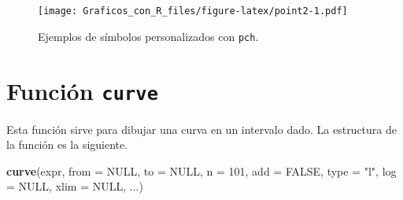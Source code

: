 \documentclass[10pt,]{krantz}
\makeatletter
\newenvironment{Shaded}{\begin{snugshade}}{\end{snugshade}}
\newcommand{\KeywordTok}[1]{\textcolor[rgb]{0.13,0.29,0.53}{\textbf{#1}}}
\newcommand{\DataTypeTok}[1]{\textcolor[rgb]{0.13,0.29,0.53}{#1}}
\newcommand{\DecValTok}[1]{\textcolor[rgb]{0.00,0.00,0.81}{#1}}
\newcommand{\FloatTok}[1]{\textcolor[rgb]{0.00,0.00,0.81}{#1}}
\newcommand{\StringTok}[1]{\textcolor[rgb]{0.31,0.60,0.02}{#1}}
\newcommand{\OtherTok}[1]{\textcolor[rgb]{0.56,0.35,0.01}{#1}}
\newcommand{\OperatorTok}[1]{\textcolor[rgb]{0.81,0.36,0.00}{\textbf{#1}}}
\newcommand{\NormalTok}[1]{#1}
\newenvironment{kframe}{%
\medskip{}
\setlength{\fboxsep}{.8em}
 \def\at@end@of@kframe{}%
 \ifinner\ifhmode%
  \def\at@end@of@kframe{\end{minipage}}%
  \begin{minipage}{\columnwidth}%
 \fi\fi%
 \def\FrameCommand##1{\hskip\@totalleftmargin \hskip-\fboxsep
 \colorbox{shadecolor}{##1}\hskip-\fboxsep
     \hskip-\linewidth \hskip-\@totalleftmargin \hskip\columnwidth}%
 \MakeFramed {\advance\hsize-\width
   \@totalleftmargin\z@ \linewidth\hsize
   \@setminipage}}%
 {\par\unskip\endMakeFramed%
 \at@end@of@kframe}
\renewenvironment{Shaded}{\begin{kframe}}{\end{kframe}}
\makeatother
\begin{document}
\begin{Shaded}
\end{Shaded}

\begin{figure}
\centering
\texttt{[image: Graficos\_con\_R\_files/figure-latex/point2-1.pdf]}
\caption{\label{fig:point2}Ejemplos de símbolos personalizados con
\texttt{pch}.}
\end{figure}

\section{\texorpdfstring{Función \texttt{curve} 
}{Función curve  }}\label{funcion-curve}

Esta función sirve para dibujar una curva en un intervalo dado. La
estructura de la función es la siguiente.

\begin{Shaded}
\begin{Highlighting}[]
\KeywordTok{curve}\NormalTok{(expr, }\DataTypeTok{from =} \OtherTok{NULL}\NormalTok{, }\DataTypeTok{to =} \OtherTok{NULL}\NormalTok{, }\DataTypeTok{n =} \DecValTok{101}\NormalTok{, }\DataTypeTok{add =} \OtherTok{FALSE}\NormalTok{,}
      \DataTypeTok{type =} \StringTok{"l"}\NormalTok{, }\DataTypeTok{log =} \OtherTok{NULL}\NormalTok{, }\DataTypeTok{xlim =} \OtherTok{NULL}\NormalTok{, ...)}
\end{Highlighting}
\end{Shaded}
\end{document}
